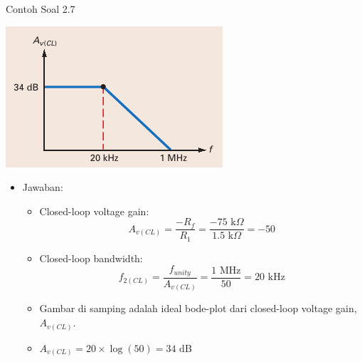 \begin{frame}[t]{Contoh Soal 2.7}
	\begin{multicols}{2}
		\begin{center}
			\includegraphics[width=0.7\linewidth]{gambar/fig-16.16b}
		\end{center}
		\columnbreak
		\begin{itemize}
			\item Jawaban:
			\begin{itemize}
				\item Closed-loop voltage gain:
				\[ A_{v(CL)} = \frac{-R_f}{R_1} = \frac{-75 \text{ k}\Omega}{1.5 \text{ k}\Omega} = -50\]
				\item Closed-loop bandwidth:
				\[ f_{2(CL)} = \frac{f_{unity}}{A_{v(CL)}} = \frac{1 \text{ MHz}}{50} = 20 \text{ kHz}\]
				\item Gambar di samping adalah ideal bode-plot dari closed-loop voltage gain, $ A_{v(CL)} $.
				\item $ A_{v(CL)} = 20 \times \log(50) = 34 \text{ dB} $
			\end{itemize}
		\end{itemize}
	\end{multicols}
\end{frame}

